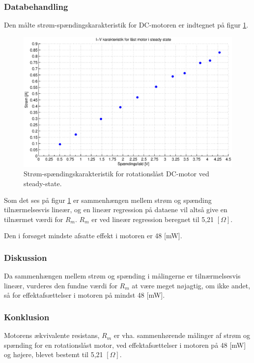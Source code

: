 \subsubsection{Databehandling}
Den målte strøm-spændingskarakteristik for DC-motoren er indtegnet på figur \ref{fig:resistans0}.
\begin{figure}[th!]
	\centering
	\includegraphics[width=1\textwidth]{./graphics/resistans1.eps}
	\caption[Strøm-spændingskarakteristik for rotationslåst DC-motor]{Strøm-spændingskarakteristik for rotationslåst DC-motor ved steady-state.}
	\label{fig:resistans0}
\end{figure}
Som det ses på figur \ref{fig:resistans0} er sammenhængen mellem strøm og spænding
tilnærmelsesvis lineær, og en lineær regression på dataene vil altså give en tilnærmet værdi for \(R_m\).
\(R_m\) er ved lineær regression beregnet til 5,21 \([\Omega]\). 

Den i forsøget mindste afsatte effekt i motoren er 48 [mW].
\subsubsection{Diskussion}
Da sammenhængen mellem strøm og spænding i målingerne er tilnærmelsesvis lineær,
vurderes den fundne værdi for \(R_m\) at være meget nøjagtig,
om ikke andet, så for effektafsættelser i motoren på mindst 48 [mW].
\subsubsection{Konklusion}
Motorens ækvivalente resistans, \(R_m\) er vha. sammenhørende målinger af strøm og spænding
for en rotationslåst motor, ved effektafsættelser i motoren på 48 [mW] og højere,
blevet bestemt til 5,21 \([\Omega]\). 
